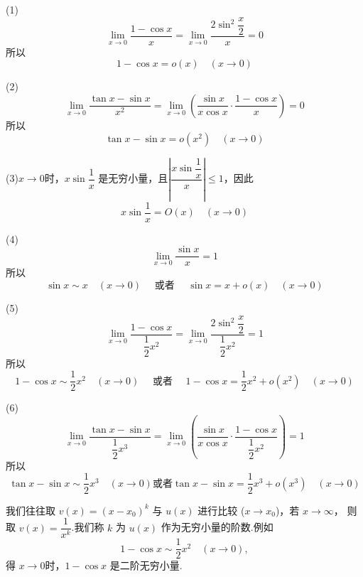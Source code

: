 \begin{example}
	(1)
	\[
	\lim_{x \to 0} \frac{1 - \cos x}{x} = \lim_{x \to 0} \dfrac{2 \sin^2 \dfrac{x}{2}}{x} = 0
	\]
	所以
	\[
	1 - \cos x = o(x) \quad (x \to 0)
	\]
	
	(2)
	\[
	\lim_{x \to 0} \frac{\tan x - \sin x}{x^2} = \lim_{x \to 0} \left( \frac{\sin x}{x \cos x} \cdot \frac{1 - \cos x}{x} \right) = 0
	\]
	所以
	\[
	\tan x - \sin x = o(x^2) \quad (x \to 0)
	\]
	
	(3)$x \to 0 $时，$x \sin \dfrac{1}{x}$ 是无穷小量，且$\left| \dfrac{x \sin \dfrac{1}{x}}{x} \right| \leqslant 1$，因此 
	\[
	x \sin \frac{1}{x} = O(x) \quad (x \to 0)
	\]
	
	(4)
	\[
	\lim_{x \to 0} \frac{\sin x}{x} = 1
	\]
	所以
	\[
	\sin x \sim x \quad (x \to 0) \quad \text{ 或者 } \quad \sin x = x + o(x) \quad (x \to 0)
	\]
	
	(5)
	\[
	\lim_{x \to 0} \dfrac{1 - \cos x}{\dfrac{1}{2} x^2} = \lim_{x \to 0} \dfrac{2 \sin^2 \dfrac{x}{2}}{\dfrac{1}{2} x^2} = 1
	\]
	所以
	\[
	1 - \cos x \sim \frac{1}{2} x^2 \quad (x \to 0) \quad \text{ 或者 } \quad 1 - \cos x = \frac{1}{2} x^2 + o(x^2) \quad (x \to 0)
	\]
	
	(6)
	\[
	\lim_{x \to 0} \frac{\tan x - \sin x}{\dfrac{1}{2} x^3} = \lim_{x \to 0} \left( \frac{\sin x}{x \cos x} \cdot \dfrac{1 - \cos x}{\dfrac{1}{2} x^2} \right) = 1
	\]
	所以
	\[
	\tan x - \sin x \sim \dfrac{1}{2} x^3 \quad (x \to 0)\text{或者}\tan x - \sin x=\frac{1}{2}x^3+o(x^3)\quad(x\to0)\]
\end{example}
我们往往取 $v(x) = (x - x_0)^k$ 与 $u(x)$ 进行比较 ($x \to x_0$)，若 $x \to \infty$，
则取 $v(x) = \dfrac{1}{x^k}$.我们称 $k$ 为 $u(x)$ 作为无穷小量的阶数.例如
\[ 1 - \cos x \sim \frac{1}{2}x^2 \quad (x \to 0), \]
得 $x \to 0$时，$1 - \cos x$ 是二阶无穷小量.

